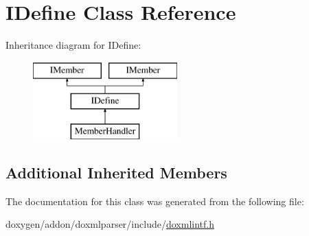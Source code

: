 \hypertarget{class_i_define}{}\section{I\+Define Class Reference}
\label{class_i_define}
Inheritance diagram for I\+Define\+:\begin{figure}[H]
\begin{center}
\leavevmode
\includegraphics[height=3.000000cm]{class_i_define}
\end{center}
\end{figure}
\subsection*{Additional Inherited Members}


The documentation for this class was generated from the following file\+:\begin{DoxyCompactItemize}
\item 
doxygen/addon/doxmlparser/include/\mbox{\hyperlink{include_2doxmlintf_8h}{doxmlintf.\+h}}\end{DoxyCompactItemize}

